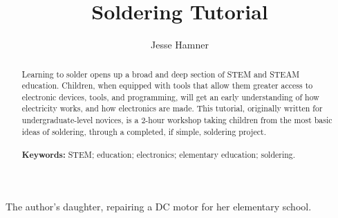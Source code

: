 \documentclass[12pt]{article}
\begin{document}
\thispagestyle{empty}
\date{}
\title{Soldering Tutorial}
\author{Jesse Hamner}


\maketitle

\begin{abstract}
Learning to solder opens up a broad and deep section of STEM and STEAM education. Children, when equipped with tools that allow them greater access to electronic devices, tools, and programming, will get an early understanding of how electricity works, and how electronics are made. This tutorial, originally written for undergraduate-level novices, is a 2-hour workshop taking children from the most basic ideas of soldering, through a completed, if simple, soldering project.\\
~\\
\textbf{Keywords:} STEM; education; electronics; elementary education; soldering.

\end{abstract}

\begin{center}

The author's daughter, repairing a DC motor for her elementary school.
\end{center}

\vfill
\end{document}
